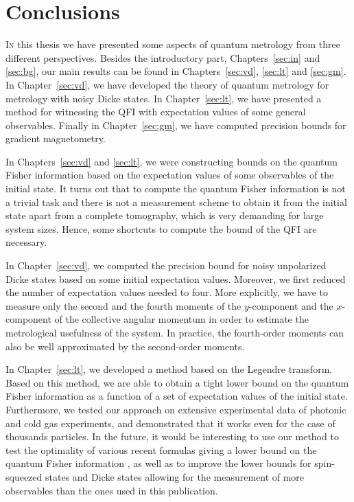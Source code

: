 \section{Conclusions}


\lettrine[lines=2, findent=3pt, nindent=0pt]{I}{n} this thesis we have presented some aspects of quantum metrology from three different perspectives.
Besides the introductory part, Chapters~\ref{sec:in} and \ref{sec:bg}, our main results can be found in Chapters~\ref{sec:vd}, \ref{sec:lt} and \ref{sec:gm}.
In Chapter~\ref{sec:vd}, we have developed the theory of quantum metrology for metrology with noisy Dicke states.
In Chapter~\ref{sec:lt}, we have presented a method for witnessing the QFI with expectation values of some general observables.
Finally in Chapter~\ref{sec:gm}, we have computed precision bounds for gradient magnetometry.

In Chapters~\ref{sec:vd} and \ref{sec:lt}, we were constructing bounds on the quantum Fisher information based on the expectation values of some observables of the initial state.
It turns out that to compute the quantum Fisher information is not a trivial task and there is not a measurement scheme to obtain it from the initial state apart from a complete tomography, which is very demanding for large system sizes.
Hence, some shortcuts to compute the bound of the QFI are necessary.

In Chapter~\ref{sec:vd}, we computed the precision bound for noisy unpolarized Dicke states based on some initial expectation values.
Moreover, we first reduced the number of expectation values needed to four.
More explicitly, we have to measure only the second and the fourth moments of the $y$-component and the $x$-component of the collective angular momentum in order to estimate the metrological usefulness of the system.
In practice, the fourth-order moments can also be well approximated by the second-order moments.

In Chapter~\ref{sec:lt}, we developed a method based on the Legendre transform.
Based on this method, we are able to obtain a tight lower bound on the quantum Fisher information as a function of a set of expectation values of the initial state.
Furthermore, we tested our approach on extensive experimental data of photonic and cold gas experiments, and demonstrated that it works even for the case of thousands particles.
In the future, it would be interesting to use our method to test the optimality of various recent formulas giving a lower bound on the quantum Fisher information \cite{Zhang2014, Oudot2015}, as well as to improve the lower bounds for spin-squeezed states and Dicke states allowing for the measurement of more observables than the ones used in this publication.

